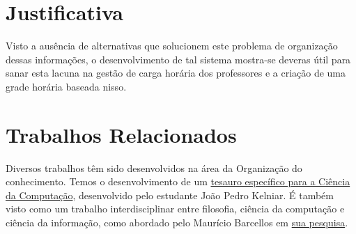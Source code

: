 \section{Justificativa} %

    Visto a ausência de alternativas que solucionem este problema de organização dessas informações, o desenvolvimento de tal sistema mostra-se deveras útil para sanar esta lacuna na gestão de carga horária dos professores e a criação de uma grade horária baseada nisso.

\section{Trabalhos Relacionados}

    Diversos trabalhos têm sido desenvolvidos na área da Organização do conhecimento. Temos o desenvolvimento de um \href{https://www.redalyc.org/journal/147/14768130022/html/}{tesauro específico para a Ciência da Computação}, desenvolvido pelo estudante João Pedro Kelniar. É também visto como um trabalho interdisciplinar entre filosofia, ciência da computação e ciência da informação, como abordado pelo Maurício Barcellos em \href{https://www.scielo.br/j/pci/a/T3BjQ9y9RvMMTJFY8mWBNBH/?lang=pt&format=pdf}{sua pesquisa}.

\begin{comment}
    Prof. Dra. Annabell del Real Tamariz
    UENF - CCT - LCMAT - Curso de Ciência da Computação
    Campos, RJ, 2023
    AARE / Disciplina: Paradigma Orientado a Objetos para o Desenvolvimento de Software (POODS) 
    Aluno: João Vítor Fernandes Dias
\end{comment}